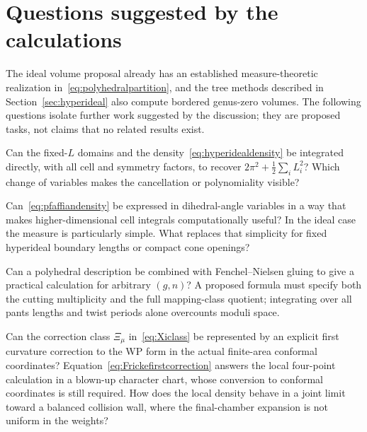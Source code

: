 \section{Questions suggested by the calculations}
\label{sec:questions}

The ideal volume proposal already has an established measure-theoretic
realization in~\eqref{eq:polyhedralpartition}, and the tree methods described
in Section~\ref{sec:hyperideal} also compute bordered genus-zero volumes.
The following questions isolate further work suggested by the discussion;
they are proposed tasks, not claims that no related results exist.

\begin{question}
Can the fixed-$L$ domains and the density~\eqref{eq:hyperidealdensity} be
integrated directly, with all cell and symmetry factors, to recover
$2\pi^2+\frac12\sum_iL_i^2$? Which change of variables makes the
cancellation or polynomiality visible?
\end{question}

\begin{question}
Can~\eqref{eq:pfaffiandensity} be expressed in dihedral-angle variables in
a way that makes higher-dimensional cell integrals computationally useful?
In the ideal case the measure is particularly simple. What replaces that
simplicity for fixed hyperideal boundary lengths or compact cone openings?
\end{question}

\begin{question}
Can a polyhedral description be combined with Fenchel--Nielsen gluing to
give a practical calculation for arbitrary $(g,n)$? A proposed formula
must specify both the cutting multiplicity and the full mapping-class
quotient; integrating over all pants lengths and twist periods alone
overcounts moduli space.
\end{question}

\begin{question}
Can the correction class $\Xi_\mu$ in~\eqref{eq:Xiclass} be represented
by an explicit first curvature correction to the WP form in
the actual finite-area conformal coordinates? Equation~\eqref{eq:Frickefirstcorrection}
answers the local four-point calculation in a blown-up character chart,
whose conversion to conformal coordinates is still required.
How does the local density behave
in a joint limit toward a balanced collision wall, where the
final-chamber expansion is not uniform in the weights?
\end{question}

